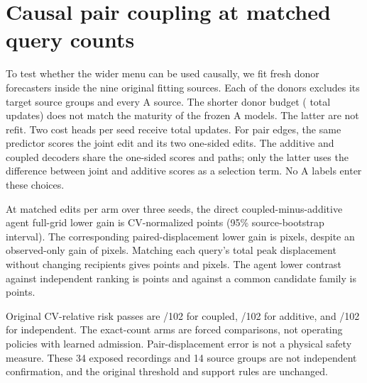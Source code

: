 \section{Causal pair coupling at matched query counts}
\label{supp:cv-joint-selector}
To test whether the wider menu can be used causally, we fit fresh donor
forecasters inside the nine original fitting sources. Each of the
\CVSelectorDonor{} donors excludes its target source groups and every A
source. The shorter donor budget (\CVSelectorDonorSteps{} total updates)
does not match the maturity of the frozen A models. The latter are not
refit. Two cost heads per seed receive \CVSelectorHeadSteps{} total updates.
For pair edges, the same predictor scores the joint edit and its two
one-sided edits. The additive and coupled decoders share the one-sided
scores and paths; only the latter uses the difference between joint
and additive scores as a selection term. No A labels enter these choices.

At \CVSelectorEdits{} matched edits per arm over three seeds, the direct
coupled-minus-additive agent full-grid lower gain is \CVSelectorAgent{}
CV-normalized points (95\% source-bootstrap interval). The corresponding
paired-displacement lower gain is \CVSelectorPair{} pixels, despite an
observed-only gain of \CVSelectorObservedPair{} pixels. Matching
each query's total peak displacement without changing recipients gives
\CVSelectorMatchedAgent{} points and \CVSelectorMatchedPair{} pixels.
The agent lower contrast against independent ranking is
\CVSelectorIndependentAgent{} points and against a common candidate
family is \CVSelectorUniformAgent{} points.

Original CV-relative risk passes are \CVSelectorJointRisk{}/102 for
coupled, \CVSelectorAddRisk{}/102 for additive, and
\CVSelectorIndependentRisk{}/102 for independent. The exact-count
arms are forced comparisons, not operating policies with learned
admission. Pair-displacement error is not a physical safety measure.
These 34 exposed recordings and 14 source groups are not independent
confirmation, and the original threshold and support rules are unchanged.
